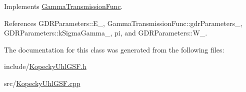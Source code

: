 Implements \hyperlink{classGammaTransmissionFunc_a68156d72ed9620f66f96dc37bbf781aa}{Gamma\-Transmission\-Func}.



References G\-D\-R\-Parameters\-::\-E\-\_\-, Gamma\-Transmission\-Func\-::gdr\-Parameters\-\_\-, G\-D\-R\-Parameters\-::k\-Sigma\-Gamma\-\_\-, pi, and G\-D\-R\-Parameters\-::\-W\-\_\-.



The documentation for this class was generated from the following files\-:\begin{DoxyCompactItemize}
\item 
include/\hyperlink{KopeckyUhlGSF_8h}{Kopecky\-Uhl\-G\-S\-F.\-h}\item 
src/\hyperlink{KopeckyUhlGSF_8cpp}{Kopecky\-Uhl\-G\-S\-F.\-cpp}\end{DoxyCompactItemize}
